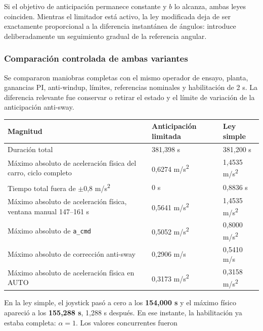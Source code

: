 \documentclass[a4paper,10pt,onecolumn,journal]{ieeeconf}
\numberwithin{equation}{section}
\begin{document}
Si el objetivo de anticipación permanece constante y $b$ lo alcanza, ambas leyes coinciden. Mientras el limitador está activo, la ley modificada deja de ser exactamente proporcional a la diferencia instantánea de ángulos: introduce deliberadamente un seguimiento gradual de la referencia angular.


\subsubsection{Comparación controlada de ambas variantes}

Se compararon maniobras completas con el mismo operador de ensayo, planta, ganancias PI, anti-windup, límites, referencias nominales y habilitación de 2 s. La diferencia relevante fue conservar o retirar el estado y el límite de variación de la anticipación anti-sway.

\begin{table}[H]
\centering
{\small
\begin{tabular}{@{}L{0.42\textwidth}L{0.24\textwidth}L{0.26\textwidth}@{}}
\toprule
Magnitud & Anticipación limitada & Ley simple\\
\midrule
Duración total & 381,398 s & 381,200 s\\
Máximo absoluto de aceleración física del carro, ciclo completo & 0,6274 m/s\textsuperscript{2} & 1,4535 m/s\textsuperscript{2}\\
Tiempo total fuera de \(\pm\)0,8 m/s\textsuperscript{2} & 0 s & 0,8836 s\\
Máximo absoluto de aceleración física, ventana manual 147--161 s & 0,5641 m/s\textsuperscript{2} & 1,4535 m/s\textsuperscript{2}\\
Máximo absoluto de \texttt{a\_cmd} & 0,5052 m/s\textsuperscript{2} & 0,8000 m/s\textsuperscript{2}\\
Máximo absoluto de corrección anti-sway & 0,2906 m/s & 0,5410 m/s\\
Máximo absoluto de aceleración física en AUTO & 0,3173 m/s\textsuperscript{2} & 0,3158 m/s\textsuperscript{2}\\
\bottomrule
\end{tabular}
}
\end{table}

En la ley simple, el joystick pasó a cero a los \textbf{154,000 s} y el máximo físico apareció a los \textbf{155,288 s}, 1,288 s después. En ese instante, la habilitación ya estaba completa: $\alpha=1$. Los valores concurrentes fueron
\end{document}
